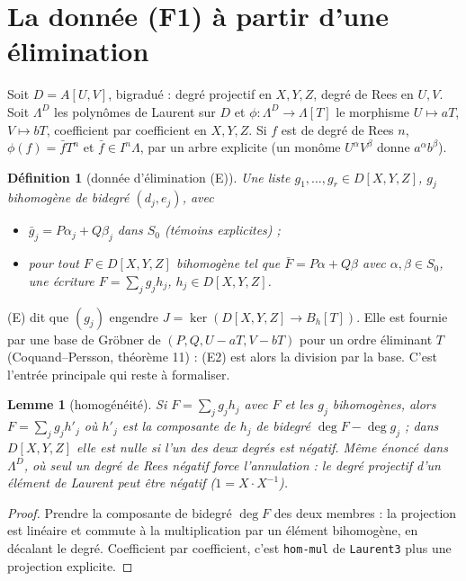 \documentclass[11pt]{amsart}
\newtheorem{lemma}[proposition]{Lemme}
\newtheorem{definition}[proposition]{Définition}
\theoremstyle{remark}
\newcommand{\La}{\Lambda}
\begin{document}
\section{La donnée (F1) à partir d'une élimination}\label{sec:F1}

Soit $D=A[U,V]$, bigradué : degré projectif en $X,Y,Z$, degré de Rees en
$U,V$. Soit $\La^D$ les polynômes de Laurent sur $D$ et
$\phi:\La^D\to\La[T]$ le morphisme $U\mapsto aT$, $V\mapsto bT$,
coefficient par coefficient en $X,Y,Z$. Si $f$ est de degré de Rees $n$,
$\phi(f)=\bar fT^n$ et $\bar f\in I^n\La$, par un arbre explicite
(un monôme $U^\alpha V^\beta$ donne $a^\alpha b^\beta$).

\begin{definition}[donnée d'élimination (E)]
Une liste $g_1,\dots,g_r\in D[X,Y,Z]$, $g_j$ bihomogène de bidegré
$(d_j,e_j)$, avec
\begin{itemize}
\item[(E1)] $\bar g_j=P\alpha_j+Q\beta_j$ dans $S_0$ (témoins explicites) ;
\item[(E2)] pour tout $F\in D[X,Y,Z]$ bihomogène tel que
 $\bar F=P\alpha+Q\beta$ avec $\alpha,\beta\in S_0$, une écriture
 $F=\sum_jg_jh_j$, $h_j\in D[X,Y,Z]$.
\end{itemize}
\end{definition}

(E) dit que $(g_j)$ engendre $J=\ker(D[X,Y,Z]\to B_h[T])$. Elle est
fournie par une base de Gröbner de $(P,Q,U-aT,V-bT)$ pour un ordre
éliminant $T$ (Coquand--Persson, théorème 11) : (E2) est alors la
division par la base. C'est l'entrée principale qui reste à formaliser.

\begin{lemma}[homogénéité]\label{lem:homog}
Si $F=\sum_jg_jh_j$ avec $F$ et les $g_j$ bihomogènes, alors
$F=\sum_jg_jh'_j$ où $h'_j$ est la composante de $h_j$ de bidegré
$\deg F-\deg g_j$ ; dans $D[X,Y,Z]$ elle est nulle si l'un des deux
degrés est négatif. Même énoncé dans $\La^D$, où seul un degré de
\emph{Rees} négatif force l'annulation : le degré projectif d'un élément
de Laurent peut être négatif ($1=X\cdot X^{-1}$).
\end{lemma}
\begin{proof}
Prendre la composante de bidegré $\deg F$ des deux membres : la
projection est linéaire et commute à la multiplication par un élément
bihomogène, en décalant le degré. Coefficient par coefficient, c'est
\texttt{hom-mul} de \texttt{Laurent3} plus une projection explicite.
\end{proof}
\end{document}
